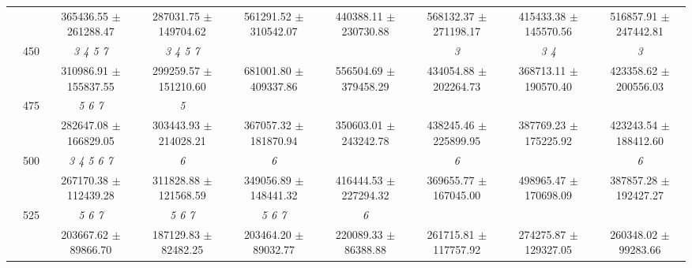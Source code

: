 \begin{table}[h]
{\begin{tabular}{
        ccccccccc}
 & & \cellcolor[HTML]{EFEFEF} 365436.55 $\pm$ 261288.47& \cellcolor[HTML]{EFEFEF} 287031.75 $\pm$ 149704.62& \cellcolor[HTML]{EFEFEF} 561291.52 $\pm$ 310542.07& \cellcolor[HTML]{EFEFEF} 440388.11 $\pm$ 230730.88& \cellcolor[HTML]{EFEFEF} 568132.37 $\pm$ 271198.17& \cellcolor[HTML]{EFEFEF} 415433.38 $\pm$ 145570.56& \cellcolor[HTML]{EFEFEF} 516857.91 $\pm$ 247442.81 \\ 
 & \multirow{2}{*}{450}& \textit{ 3 4 5 7 }& \textit{ 3 4 5 7 }& & & \textit{ 3 }& \textit{ 3 4 }& \textit{ 3 } \\ 
 & & 310986.91 $\pm$ 155837.55& 299259.57 $\pm$ 151210.60& 681001.80 $\pm$ 409337.86& 556504.69 $\pm$ 379458.29& 434054.88 $\pm$ 202264.73& 368713.11 $\pm$ 190570.40& 423358.62 $\pm$ 200556.03 \\ 
 & \multirow{2}{*}{475}& \cellcolor[HTML]{EFEFEF} \textit{ 5 6 7 }& \cellcolor[HTML]{EFEFEF} \textit{ 5 }& \cellcolor[HTML]{EFEFEF} & \cellcolor[HTML]{EFEFEF} & \cellcolor[HTML]{EFEFEF} & \cellcolor[HTML]{EFEFEF} & \cellcolor[HTML]{EFEFEF}  \\ 
 & & \cellcolor[HTML]{EFEFEF} 282647.08 $\pm$ 166829.05& \cellcolor[HTML]{EFEFEF} 303443.93 $\pm$ 214028.21& \cellcolor[HTML]{EFEFEF} 367057.32 $\pm$ 181870.94& \cellcolor[HTML]{EFEFEF} 350603.01 $\pm$ 243242.78& \cellcolor[HTML]{EFEFEF} 438245.46 $\pm$ 225899.95& \cellcolor[HTML]{EFEFEF} 387769.23 $\pm$ 175225.92& \cellcolor[HTML]{EFEFEF} 423243.54 $\pm$ 188412.60 \\ 
 & \multirow{2}{*}{500}& \textit{ 3 4 5 6 7 }& \textit{ 6 }& \textit{ 6 }& & \textit{ 6 }& & \textit{ 6 } \\ 
 & & 267170.38 $\pm$ 112439.28& 311828.88 $\pm$ 121568.59& 349056.89 $\pm$ 148441.32& 416444.53 $\pm$ 227294.32& 369655.77 $\pm$ 167045.00& 498965.47 $\pm$ 170698.09& 387857.28 $\pm$ 192427.27 \\ 
 & \multirow{2}{*}{525}& \cellcolor[HTML]{EFEFEF} \textit{ 5 6 7 }& \cellcolor[HTML]{EFEFEF} \textit{ 5 6 7 }& \cellcolor[HTML]{EFEFEF} \textit{ 5 6 7 }& \cellcolor[HTML]{EFEFEF} \textit{ 6 }& \cellcolor[HTML]{EFEFEF} & \cellcolor[HTML]{EFEFEF} & \cellcolor[HTML]{EFEFEF}  \\ 
 & & \cellcolor[HTML]{EFEFEF} 203667.62 $\pm$ 89866.70& \cellcolor[HTML]{EFEFEF} 187129.83 $\pm$ 82482.25& \cellcolor[HTML]{EFEFEF} 203464.20 $\pm$ 89032.77& \cellcolor[HTML]{EFEFEF} 220089.33 $\pm$ 86388.88& \cellcolor[HTML]{EFEFEF} 261715.81 $\pm$ 117757.92& \cellcolor[HTML]{EFEFEF} 274275.87 $\pm$ 129327.05& \cellcolor[HTML]{EFEFEF} 260348.02 $\pm$ 99283.66 \\ 

\end{tabular}}
\end{table}
